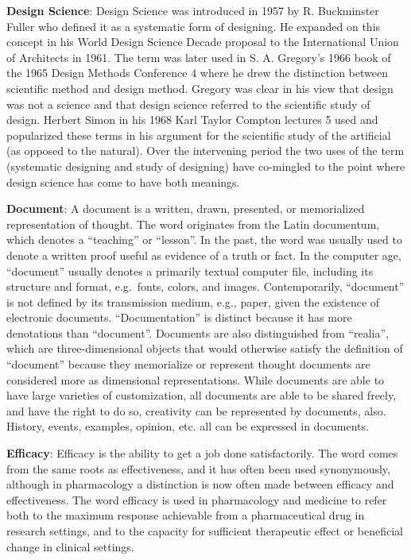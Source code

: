 \documentclass[b5paper,]{book}
\theoremstyle{definition}
\theoremstyle{definition}
\theoremstyle{definition}
\theoremstyle{remark}
\begin{document}
\textbf{Design Science}: Design Science was introduced in 1957 by R.
Buckminster Fuller who defined it as a systematic form of designing. He
expanded on this concept in his World Design Science Decade proposal to
the International Union of Architects in 1961. The term was later used
in S. A. Gregory's 1966 book of the 1965 Design Methods Conference 4
where he drew the distinction between scientific method and design
method. Gregory was clear in his view that design was not a science and
that design science referred to the scientific study of design. Herbert
Simon in his 1968 Karl Taylor Compton lectures 5 used and popularized
these terms in his argument for the scientific study of the artificial
(as opposed to the natural). Over the intervening period the two uses of
the term (systematic designing and study of designing) have co-mingled
to the point where design science has come to have both meanings.

\textbf{Document}: A document is a written, drawn, presented, or
memorialized representation of thought. The word originates from the
Latin documentum, which denotes a ``teaching'' or ``lesson''. In the
past, the word was usually used to denote a written proof useful as
evidence of a truth or fact. In the computer age, ``document'' usually
denotes a primarily textual computer file, including its structure and
format, e.g.~fonts, colors, and images. Contemporarily, ``document'' is
not defined by its transmission medium, e.g., paper, given the existence
of electronic documents. ``Documentation'' is distinct because it has
more denotations than ``document''. Documents are also distinguished
from ``realia'', which are three-dimensional objects that would
otherwise satisfy the definition of ``document'' because they
memorialize or represent thought documents are considered more as
dimensional representations. While documents are able to have large
varieties of customization, all documents are able to be shared freely,
and have the right to do so, creativity can be represented by documents,
also. History, events, examples, opinion, etc. all can be expressed in
documents.

\textbf{Efficacy}: Efficacy is the ability to get a job done
satisfactorily. The word comes from the same roots as effectiveness, and
it has often been used synonymously, although in pharmacology a
distinction is now often made between efficacy and effectiveness. The
word efficacy is used in pharmacology and medicine to refer both to the
maximum response achievable from a pharmaceutical drug in research
settings, and to the capacity for sufficient therapeutic effect or
beneficial change in clinical settings.
\end{document}
